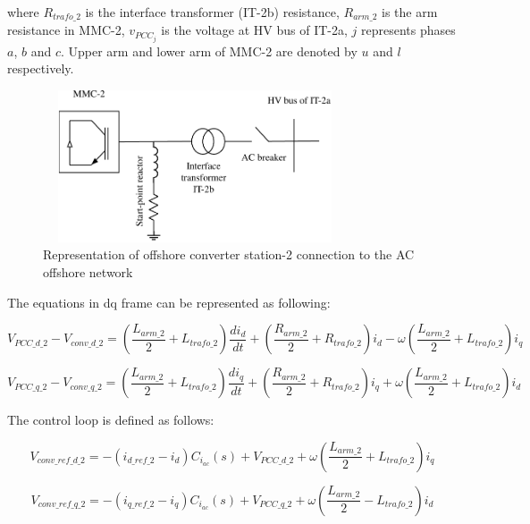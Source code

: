 where $R_{trafo\_2}$ is the interface transformer (IT-2b) resistance, $R_{arm\_2}$ is the arm resistance in \gls{MMC}-2, $v_{PCC_j}$ is the voltage at \gls{HV} bus of IT-2a, $j$ represents phases $a$, $b$ and $c$. Upper arm and lower arm of \gls{MMC}-2 are denoted by $u$ and $l$ respectively.

\begin{figure}[H]
\centering
    \includegraphics[height = 4.5cm,width = 9cm]{Diagrams/Chapter_4/MMC_pow_system_1_new.pdf}
    \caption{Representation of offshore converter station-2 connection to the AC offshore network \cite{saad2015modelisation}}
    \label{fig:MMC_pow_system_1}
\end{figure}


The equations in \gls{dq} frame can be represented as following:

\begin{equation}
    V_{PCC\_d\_2} - V_{conv\_d\_2} = \left(\frac{L_{arm\_2}}{2} + L_{trafo\_2}\right)\frac{di_{d}}{dt} +\left (\frac{R_{arm\_2}}{2}+R_{trafo\_2}\right)i_d-\omega\left(\frac{L_{arm\_2}}{2}+L_{trafo\_2}\right)i_q
\end{equation}

\begin{equation}
    V_{PCC\_q\_2} - V_{conv\_q\_2} = \left(\frac{L_{arm\_2}}{2} + L_{trafo\_2}\right)\frac{di_{q}}{dt} +\left (\frac{R_{arm\_2}}{2}+R_{trafo\_2}\right)i_q+\omega\left(\frac{L_{arm\_2}}{2}+L_{trafo\_2}\right)i_d
\end{equation}

The control loop is defined as follows:

\begin{equation}
    V_{conv\_ref\_d\_2} = - \left(i_{d\_ref\_2} - i_d\right)C_{i_{ac}}\left(s\right) + V_{PCC\_d\_2} + \omega\left(\frac{L_{arm\_2}}{2}+L_{trafo\_2}\right)i_q
\end{equation}

\begin{equation}
    V_{conv\_ref\_q\_2} = - \left(i_{q\_ref\_2} - i_q\right)C_{i_{ac}}\left(s\right) + V_{PCC\_q\_2} + \omega\left(\frac{L_{arm\_2}}{2}-L_{trafo\_2}\right)i_d
\end{equation}

